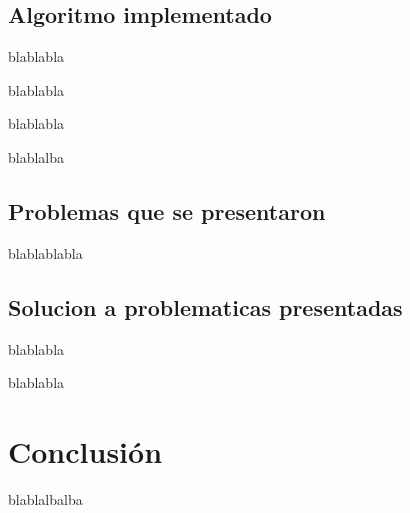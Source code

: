 \documentclass{article}
\begin{document}
\vspace{8cm}

\subsection{Algoritmo implementado}
blablabla

 \vspace{1cm}
 
blablabla

 \vspace{1cm}
 
blablabla

 \vspace{1cm}
 
blablalba 

 \vspace{1cm}



\subsection{Problemas que se presentaron}

blablablabla


\vspace{5cm}

\subsection{Solucion a problematicas presentadas}

blablabla 

\vspace{1cm}

blablabla

\vspace{8cm}
\section{Conclusión} \label{conclulsion}
blablalbalba

\vspace{1cm}
\end{document}
